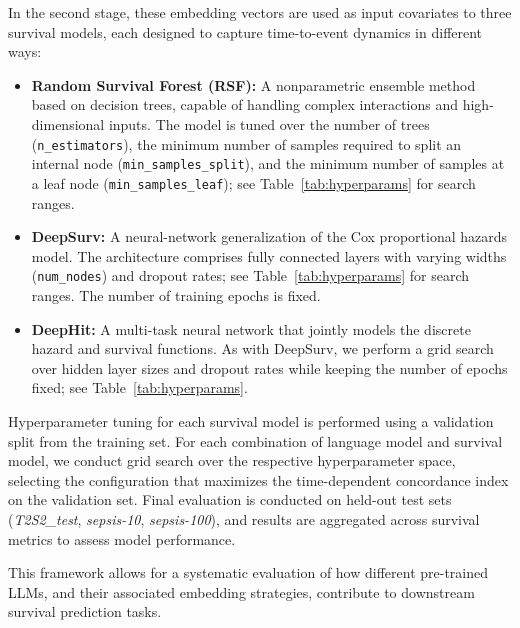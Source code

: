 In the second stage, these embedding vectors are used as input covariates to three survival models, each designed to capture time-to-event dynamics in different ways:

\begin{itemize}
    \item \textbf{Random Survival Forest (RSF):} 
    A nonparametric ensemble method based on decision trees, capable of handling complex interactions and high-dimensional inputs. 
    The model is tuned over the number of trees (\texttt{n\_estimators}), the minimum number of samples required to split an internal node (\texttt{min\_samples\_split}), and the minimum number of samples at a leaf node (\texttt{min\_samples\_leaf}); see Table~\ref{tab:hyperparams} for search ranges.

    \item \textbf{DeepSurv:} 
    A neural-network generalization of the Cox proportional hazards model. 
    The architecture comprises fully connected layers with varying widths (\texttt{num\_nodes}) and dropout rates; see Table~\ref{tab:hyperparams} for search ranges. The number of training epochs is fixed.

    \item \textbf{DeepHit:} 
    A multi-task neural network that jointly models the discrete hazard and survival functions. 
    As with DeepSurv, we perform a grid search over hidden layer sizes and dropout rates while keeping the number of epochs fixed; see Table~\ref{tab:hyperparams}.
\end{itemize}

Hyperparameter tuning for each survival model is performed using a validation split from the training set. 
For each combination of language model and survival model, we conduct grid search over the respective hyperparameter space, selecting the configuration that maximizes the time-dependent concordance index \citep{antolini2005time} on the validation set. 
Final evaluation is conducted on held-out test sets (\textit{T2S2\_test}, \textit{sepsis-10}, \textit{sepsis-100}), and results are aggregated across survival metrics to assess model performance.

This framework allows for a systematic evaluation of how different pre-trained LLMs, and their associated embedding strategies, contribute to downstream survival prediction tasks.
\clearpage
\onecolumn

